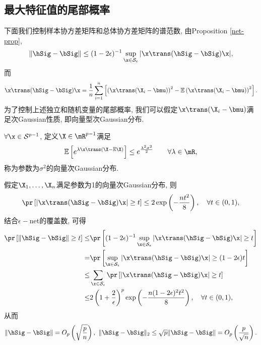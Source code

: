 \subsection{最大特征值的尾部概率}
下面我们控制样本协方差矩阵和总体协方差矩阵的谱范数, 由Proposition \ref{net-prop},
\begin{align*}
    \|\hSig-\bSig\| \leq (1-2\epsilon)^{-1} \sup_{\x \in \mS_\epsilon} |\x \trans (\hSig-\bSig) \x|,
\end{align*}
而
\begin{align*}
    \x \trans (\hSig-\bSig) \x= \frac{1}{n}\sum_{i=1}^n \left[ \left(\x \trans (\X_i-\bmu)\right)^2-\E \left(\x \trans (\X_i-\bmu)\right)^2\right].
\end{align*}
为了控制上述独立和随机变量的尾部概率, 我们可以假定$\x \trans (\X_i-\bmu)$满足次Gaussian性质, 即向量型次Gaussian分布.
\begin{defin}[向量次Gaussian分布]
$\forall \x \in \mS^{p-1}$, 定义$\X \in \mR^{p-1}$满足
    \begin{align*}
        \E\left[e^{\lambda \x \trans (\X-\E \X)}\right] \leq e^{\frac{\lambda^{2}\sigma^2}{2}} \qquad \forall \lambda \in \mR,
    \end{align*}
称为参数为$\sigma^2$的向量次Gaussian分布.    
\end{defin}
假定$\X_1,\ldots,\X_n$满足参数为1的向量次Gaussian分布, 则
\begin{align*}
    \pr \left[ \left| \x \trans (\hSig-\bSig) \x\right| \geq t  \right] \leq 2 \exp\left( -\frac{nt^2}{8}\right), \quad \forall t \in(0,1),
\end{align*}
结合$\epsilon-$net的覆盖数, 可得
\begin{align*}
    \pr \left[ \|\hSig-\bSig\| \geq t   \right] \leq & \pr \left[ (1-2\epsilon)^{-1} \sup_{\x \in \mS_\epsilon} |\x \trans (\hSig-\bSig) \x| \geq t   \right]\\
    =& \pr \left[\sup_{\x \in \mS_\epsilon} |\x \trans (\hSig-\bSig) \x| \geq (1-2\epsilon) t   \right]\\
 \leq & \sum_{\x \in \mS_\epsilon} \pr \left[ \left| \x \trans (\hSig-\bSig) \x\right| \geq t  \right] \\
 \leq & 2 \left(1+\frac{2}{\epsilon}\right)^p \exp\left( -\frac{n(1-2\epsilon)^2 t^2}{8}\right), \quad \forall t \in(0,1),
\end{align*}
从而
\begin{align*}
    \|\hSig-\bSig\|=O_p\left( \sqrt{\frac{p}{n}}  \right),~\|\hSig-\bSig\|_2 \leq \sqrt{p}  \|\hSig-\bSig\|=O_p\left( \frac{p}{\sqrt{n}} \right).
\end{align*}
